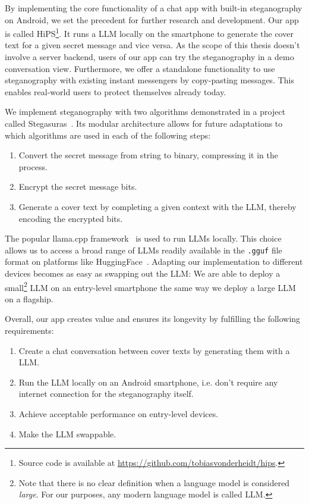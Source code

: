By implementing the core functionality of a chat app with built-in steganography on Android, we set the precedent for further research and development. Our app is called \gls{HiPS}\footnote{Source code is available at \url{https://github.com/tobiasvonderheidt/hips}.}. It runs a \gls{LLM} locally on the smartphone to generate the cover text for a given secret message and vice versa. As the scope of this thesis doesn't involve a server backend, users of our app can try the steganography in a demo conversation view. Furthermore, we offer a standalone functionality to use steganography with existing instant messengers by copy-pasting messages. This enables real-world users to protect themselves already today.

We implement steganography with two algorithms demonstrated in a project called Stegasuras~\cite{zieglerNeuralLinguisticSteganography2019}. Its modular architecture allows for future adaptations to which algorithms are used in each of the following steps:

\begin{enumerate}
    \item Convert the secret message from string to binary, compressing it in the process.
    \item Encrypt the secret message bits.
    \item Generate a cover text by completing a given context with the \gls{LLM}, thereby encoding the encrypted bits.
\end{enumerate}

The popular llama.cpp framework~\cite{gerganovGgerganovLlamacpp2024} is used to run \glspl{LLM} locally. This choice allows us to access a broad range of \glspl{LLM} readily available in the \lstinline|.gguf| file format on platforms like HuggingFace~\cite{huggingfaceModelsHuggingFace2025}. Adapting our implementation to different devices becomes as easy as swapping out the \gls{LLM}: We are able to deploy a small\footnote{Note that there is no clear definition when a language model is considered \textit{large}. For our purposes, any modern language model is called \gls{LLM}.} \gls{LLM} on an entry-level smartphone the same way we deploy a large \gls{LLM} on a flagship.

Overall, our app creates value and ensures its longevity by fulfilling the following requirements:

\begin{enumerate}
    \item Create a chat conversation between cover texts by generating them with a \gls{LLM}.
    \item Run the \gls{LLM} locally on an Android smartphone, i.e. don't require any internet connection for the steganography itself.
    \item Achieve acceptable performance on entry-level devices.
    \item Make the \gls{LLM} swappable.
\end{enumerate}

